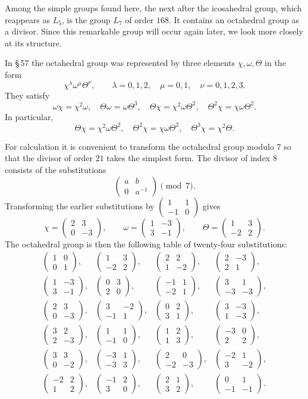 \documentclass[11pt]{article}
\providecommand{\mat}[4]{\begin{pmatrix}#1&#2\\#3&#4\end{pmatrix}}
\providecommand{\mat}[4]{\begin{pmatrix}#1&#2\\#3&#4\end{pmatrix}}
\begin{document}
Among the simple groups found here, the next after the icosahedral group, which reappears as $L_5$, is the group $L_7$ of order $168$. It contains an octahedral group as a divisor. Since this remarkable group will occur again later, we look more closely at its structure.

In \S\,57 the octahedral group was represented by three elements $\chi,\omega,\Theta$ in the form
\begin{equation}
 \chi^{\lambda}\omega^{\mu}\Theta^{\nu},
 \qquad \lambda=0,1,2,
 \quad \mu=0,1,
 \quad \nu=0,1,2,3.
 \tag{1}
\end{equation}
They satisfy
\begin{equation}
 \omega\chi=\chi^2\omega,
 \quad \Theta\omega=\omega\Theta^3,
 \quad \Theta\chi=\chi^2\omega\Theta^2,
 \quad \Theta^2\chi=\chi\omega\Theta^2.
 \tag{2}
\end{equation}
In particular,
\begin{equation}
 \Theta\chi=\chi^2\omega\Theta^2,
 \quad \Theta^2\chi=\chi\omega\Theta^2,
 \quad \Theta^3\chi=\chi^2\Theta.
 \tag{3}
\end{equation}

For calculation it is convenient to transform the octahedral group modulo $7$ so that the divisor of order $21$ takes the simplest form. The divisor of index $8$ consists of the substitutions
\begin{equation}
 \mat{a}{b}{0}{a^{-1}}\pmod7.
 \tag{4}
\end{equation}
Transforming the earlier substitutions by $\mat{1}{1}{-1}{0}$ gives
\begin{equation}
 \chi=\mat{2}{3}{0}{-3},
 \qquad
 \omega=\mat{1}{-3}{3}{-1},
 \qquad
 \Theta=\mat{1}{3}{-2}{2}.
 \tag{5}
\end{equation}
The octahedral group is then the following table of twenty-four substitutions:
\begin{equation}
\begin{array}{rrrr}
\mat{1}{0}{0}{1},&\mat{1}{3}{-2}{2},&\mat{2}{2}{1}{-2},&\mat{2}{-3}{2}{1},\\[0.7em]
\mat{1}{-3}{3}{-1},&\mat{0}{3}{2}{0},&\mat{-1}{1}{-2}{1},&\mat{3}{1}{-3}{-3},\\[0.7em]
\mat{2}{3}{0}{-3},&\mat{3}{-2}{-1}{1},&\mat{0}{2}{3}{1},&\mat{3}{-3}{1}{-3},\\[0.7em]
\mat{3}{2}{2}{-3},&\mat{1}{1}{-1}{0},&\mat{1}{2}{1}{3},&\mat{-3}{0}{2}{2},\\[0.7em]
\mat{3}{3}{0}{-2},&\mat{-3}{1}{-3}{3},&\mat{2}{0}{-2}{-3},&\mat{-2}{1}{3}{-2},\\[0.7em]
\mat{-2}{2}{1}{2},&\mat{-1}{2}{3}{0},&\mat{2}{1}{3}{2},&\mat{0}{1}{-1}{-1}.
\end{array}
\tag{6}
\end{equation}
\end{document}
